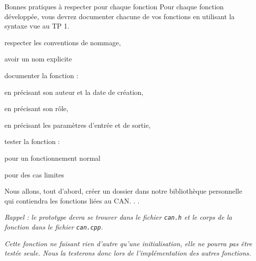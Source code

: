 \documentclass[TP, noCustomPackages]{UPSTI_Document}
\begin{document}
\begin{UPSTIinfor}{Bonnes pratiques à respecter pour chaque fonction}
    Pour chaque fonction développée, vous devrez documenter chacune de vos fonctions en utilisant la syntaxe vue au TP 1. 
\begin{todolist}
    \item respecter les conventions de nommage,
    \item avoir un nom explicite
    \item documenter la fonction : 
    \begin{todolist}
        \item en précisant son auteur et la date de création,
        \item en précisant son rôle,
        \item en précisant les paramètres d'entrée et de sortie,
    \end{todolist}
    \item tester la fonction : 
    \begin{todolist}
        \item pour un fonctionnement normal
        \item pour des cas limites
    \end{todolist}
\end{todolist}

\end{UPSTIinfor}

\begin{UPSTIactivite}
    Nous allons, tout d'abord, créer un dossier dans notre bibliothèque personnelle qui contiendra les fonctions liées au CAN.
    .
    .
\end{UPSTIactivite}

\begin{UPSTIactivite}
    
    \emph{Rappel : le prototype devra se trouver dans le fichier \texttt{can.h} et le corps de la fonction dans le fichier \texttt{can.cpp}.}

    \emph{Cette fonction ne faisant rien d'autre qu'une initialisation, elle ne pourra pas être testée seule. Nous la testerons donc lors de l'implémentation des autres fonctions.}
\end{UPSTIactivite}
\end{document}
